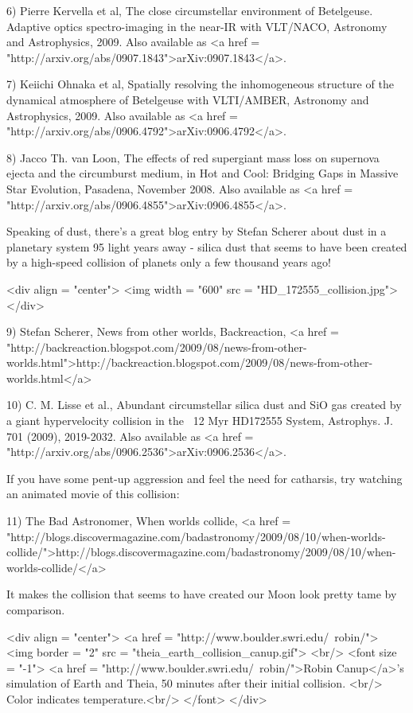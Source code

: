 6) Pierre Kervella et al, The close circumstellar environment of
Betelgeuse. Adaptive optics spectro-imaging in the near-IR with
VLT/NACO, Astronomy and Astrophysics, 2009.  Also available as
<a href = "http://arxiv.org/abs/0907.1843">arXiv:0907.1843</a>.

7) Keiichi Ohnaka et al, Spatially resolving the inhomogeneous
structure of the dynamical atmosphere of Betelgeuse with VLTI/AMBER,
Astronomy and Astrophysics, 2009.  Also available as <a href =
"http://arxiv.org/abs/0906.4792">arXiv:0906.4792</a>.

8) Jacco Th. van Loon, The effects of red supergiant mass loss on
supernova ejecta and the circumburst medium, in Hot and Cool: Bridging 
Gaps in Massive Star Evolution, Pasadena, November 2008.  Also available
as <a href = "http://arxiv.org/abs/0906.4855">arXiv:0906.4855</a>.

Speaking of dust, there's a great blog entry by Stefan Scherer about
dust in a planetary system 95 light years away - silica dust that seems 
to have been created by a high-speed collision of planets only a few 
thousand years ago!

<div align = "center">
<img width = "600" src = "HD_172555_collision.jpg">
</div>

9) Stefan Scherer, News from other worlds, Backreaction, 
<a href = "http://backreaction.blogspot.com/2009/08/news-from-other-worlds.html">http://backreaction.blogspot.com/2009/08/news-from-other-worlds.html</a>

10) C. M. Lisse et al., Abundant circumstellar silica dust and SiO gas
created by a giant hypervelocity collision in the ~12 Myr HD172555
System, Astrophys. J. 701 (2009), 2019-2032.  Also available as <a
href = "http://arxiv.org/abs/0906.2536">arXiv:0906.2536</a>.

If you have some pent-up aggression and feel the need for catharsis, 
try watching an animated movie of this collision:

11) The Bad Astronomer, When worlds collide, 
<a href = "http://blogs.discovermagazine.com/badastronomy/2009/08/10/when-worlds-collide/">http://blogs.discovermagazine.com/badastronomy/2009/08/10/when-worlds-collide/</a>

It makes the collision that seems to have created our Moon look pretty
tame by comparison. 

<div align = "center">
<a href = "http://www.boulder.swri.edu/~robin/">
<img border = "2" src = "theia_earth_collision_canup.gif">
<br/>
<font size = "-1">
<a href = "http://www.boulder.swri.edu/~robin/">Robin
Canup</a>'s simulation of
Earth and Theia, 50 minutes after their initial collision.  <br/>
Color indicates temperature.<br/>
</font>
</div>

